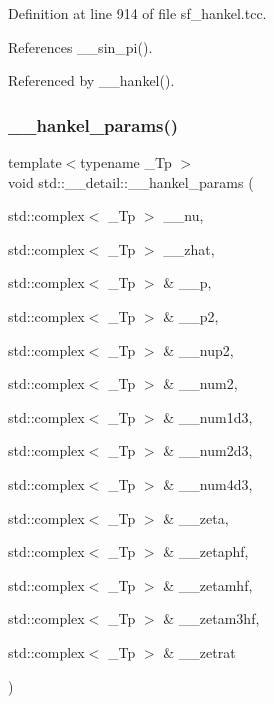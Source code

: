 Definition at line 914 of file sf\+\_\+hankel.\+tcc.



References \+\_\+\+\_\+sin\+\_\+pi().



Referenced by \+\_\+\+\_\+hankel().

\mbox{\label{namespacestd_1_1____detail_aff42671a79cd3852a57752f79c82f8da}} 
\subsubsection{\texorpdfstring{\+\_\+\+\_\+hankel\+\_\+params()}{\_\_hankel\_params()}}
{\footnotesize\ttfamily template$<$typename \+\_\+\+Tp $>$ \\
void std\+::\+\_\+\+\_\+detail\+::\+\_\+\+\_\+hankel\+\_\+params (\begin{DoxyParamCaption}\item[{std\+::complex$<$ \+\_\+\+Tp $>$}]{\+\_\+\+\_\+nu,  }\item[{std\+::complex$<$ \+\_\+\+Tp $>$}]{\+\_\+\+\_\+zhat,  }\item[{std\+::complex$<$ \+\_\+\+Tp $>$ \&}]{\+\_\+\+\_\+p,  }\item[{std\+::complex$<$ \+\_\+\+Tp $>$ \&}]{\+\_\+\+\_\+p2,  }\item[{std\+::complex$<$ \+\_\+\+Tp $>$ \&}]{\+\_\+\+\_\+nup2,  }\item[{std\+::complex$<$ \+\_\+\+Tp $>$ \&}]{\+\_\+\+\_\+num2,  }\item[{std\+::complex$<$ \+\_\+\+Tp $>$ \&}]{\+\_\+\+\_\+num1d3,  }\item[{std\+::complex$<$ \+\_\+\+Tp $>$ \&}]{\+\_\+\+\_\+num2d3,  }\item[{std\+::complex$<$ \+\_\+\+Tp $>$ \&}]{\+\_\+\+\_\+num4d3,  }\item[{std\+::complex$<$ \+\_\+\+Tp $>$ \&}]{\+\_\+\+\_\+zeta,  }\item[{std\+::complex$<$ \+\_\+\+Tp $>$ \&}]{\+\_\+\+\_\+zetaphf,  }\item[{std\+::complex$<$ \+\_\+\+Tp $>$ \&}]{\+\_\+\+\_\+zetamhf,  }\item[{std\+::complex$<$ \+\_\+\+Tp $>$ \&}]{\+\_\+\+\_\+zetam3hf,  }\item[{std\+::complex$<$ \+\_\+\+Tp $>$ \&}]{\+\_\+\+\_\+zetrat }\end{DoxyParamCaption})}



